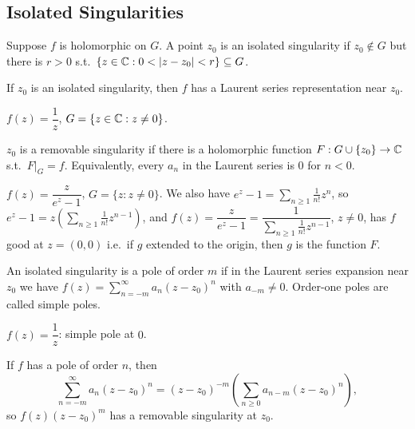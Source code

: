 \documentclass[11pt]{article}
\begin{document}
\subsection{Isolated Singularities}

\begin{definition}
Suppose $f$ is holomorphic on $G$. A point $z_0$ is an isolated singularity if $z_0\notin G$ but there is $r>0$ s.t.\ $\{z\in\C : 0<|z-z_0|<r\}\subseteq G$.
\end{definition}

\begin{remark}
If $z_0$ is an isolated singularity, then $f$ has a Laurent series representation near $z_0$.
\end{remark}

\begin{example}
$f(z)=\dfrac1z$, $G=\{z\in{\mathbb{C}} : z\ne0\}$.
\end{example}

\begin{definition}
$z_0$ is a removable singularity if there is a holomorphic function $F:G\cup\{z_0\}\to{\mathbb{C}}$ s.t.\ $F|_G = f$. Equivalently, every $a_n$ in the Laurent series is $0$ for $n<0$.
\end{definition}

\begin{example}
$f(z) = \dfrac{z}{e^z-1}$, $G=\{z : z\ne0\}$. We also have $e^z-1=\sum_{n\ge1}\frac{1}{n!}z^n$, so $e^z-1=z\left(\sum_{n\ge1}\frac{1}{n!}z^{n-1}\right)$, and $f(z)=\dfrac{z}{e^z-1} = \dfrac{1}{\sum_{n\ge1}\frac{1}{n!}z^{n-1}}$, $z\ne0$, has $f$ good at $z=(0,0)$ i.e.\ if $g$ extended to the origin, then $g$ is the function $F$.
\end{example}

\begin{definition}[Pole]
An isolated singularity is a pole of order $m$ if in the Laurent series expansion near $z_0$ we have $f(z) = \sum_{n=-m}^\infty a_n(z-z_0)^n$ with $a_{-m}\ne0$. Order-one poles are called simple poles.
\end{definition}

\begin{example}
$f(z) = \dfrac1z$: simple pole at $0$.
\end{example}

If $f$ has a pole of order $n$, then
\[
\sum_{n=-m}^\infty a_n(z-z_0)^n = (z-z_0)^{-m}\left(\sum_{n\ge0} a_{n-m}(z-z_0)^n\right),
\]
so $f(z)(z-z_0)^m$ has a removable singularity at $z_0$.
\end{document}
